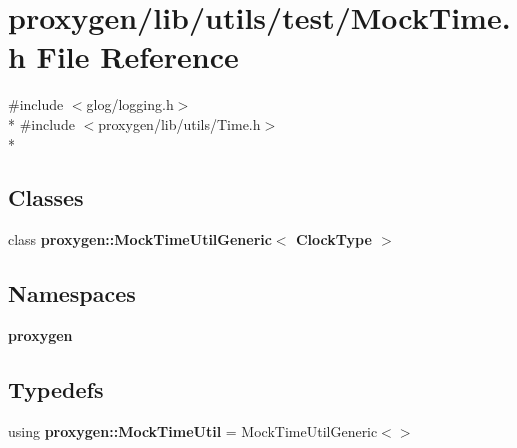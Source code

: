 \section{proxygen/lib/utils/test/\+Mock\+Time.h File Reference}
\label{MockTime_8h}
{\ttfamily \#include $<$glog/logging.\+h$>$}\\*
{\ttfamily \#include $<$proxygen/lib/utils/\+Time.\+h$>$}\\*
\subsection*{Classes}
\begin{DoxyCompactItemize}
\item 
class {\bf proxygen\+::\+Mock\+Time\+Util\+Generic$<$ Clock\+Type $>$}
\end{DoxyCompactItemize}
\subsection*{Namespaces}
\begin{DoxyCompactItemize}
\item 
 {\bf proxygen}
\end{DoxyCompactItemize}
\subsection*{Typedefs}
\begin{DoxyCompactItemize}
\item 
using {\bf proxygen\+::\+Mock\+Time\+Util} = Mock\+Time\+Util\+Generic$<$$>$
\end{DoxyCompactItemize}
